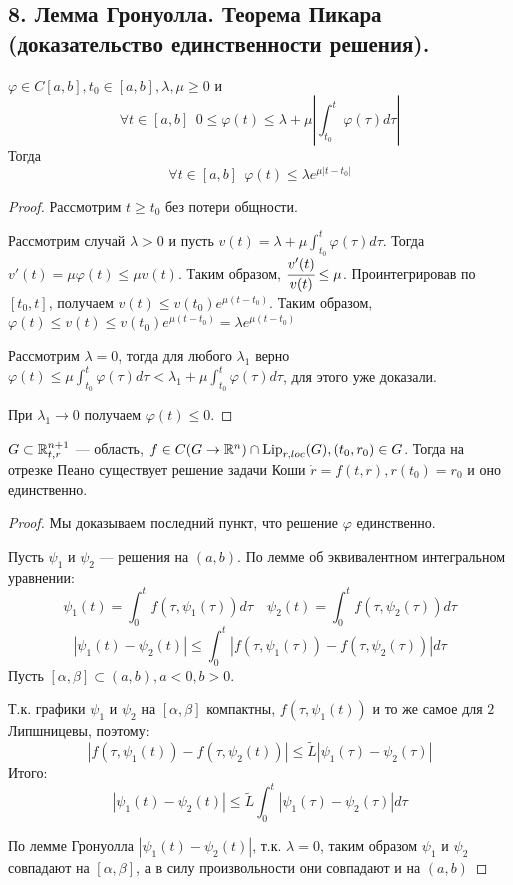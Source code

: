 \subsection*{8. Лемма Гронуолла. Теорема Пикара (доказательство единственности решения).}

\begin{lemma}[Гронуолл]
    \(\varphi\in C[a, b], t_0\in[a, b], \lambda,\mu \geq 0\) и
    \[\forall t\in[a, b] \ \ 0 \leq \varphi(t) \leq \lambda + \mu\left|\int_{t_0}^t \varphi(\tau)d\tau\right|\]
    Тогда
    \[\forall t\in[a, b] \ \ \varphi(t) \leq \lambda e^{\mu|t - t_0|}\]
\end{lemma}
\begin{proof}
    Рассмотрим \(t \geq t_0\) без потери общности.

    Рассмотрим случай \(\lambda > 0\) и пусть \(v(t) = \lambda + \mu\int_{t_0}^t \varphi(\tau)d\tau\). Тогда \(v'(t) = \mu\varphi(t) \leq \mu v(t)\). Таким образом, \(\cfrac{v'(t)}{v(t)} \leq \mu\). Проинтегрировав по \([t_0, t]\), получаем \(v(t) \leq v(t_0)e^{\mu(t - t_0)}\). Таким образом, \(\varphi(t) \leq v(t) \leq v(t_0)e^{\mu(t - t_0)} = \lambda e^{\mu(t - t_0)}\)

    Рассмотрим \(\lambda = 0\), тогда для любого \(\lambda_1\) верно \(\varphi(t) \leq \mu\int_{t_0}^t \varphi(\tau)d\tau < \lambda_1 + \mu\int_{t_0}^t \varphi(\tau)d\tau\), для этого уже доказали.

    При \(\lambda_1 \to 0\) получаем \(\varphi(t) \leq 0\).
\end{proof}

\begin{theorem}
    \(G\subset \mathbb{R}^{n + 1}_{t, r}\) --- область, \(f\in C(G \to \mathbb{R}^n)\cap \text{Lip}_{r, loc}(G), (t_0,r_0)\in G\). Тогда на отрезке Пеано существует решение задачи Коши \(\dot{r} = f(t, r), r(t_0) = r_0\) и оно единственно.
\end{theorem}

\begin{proof}
    Мы доказываем последний пункт, что решение \(\varphi\) единственно.

    Пусть \(\psi_1\) и \(\psi_2\) --- решения на \((a, b)\). По лемме об эквивалентном интегральном уравнении:
    \[\psi_1(t) = \int_0^t f(\tau, \psi_1(\tau))d\tau \quad \psi_2(t) = \int_0^t f(\tau, \psi_2(\tau))d\tau\]
    \[|\psi_1(t) - \psi_2(t)| \leq \int_0^t |f(\tau, \psi_1(\tau)) - f(\tau, \psi_2(\tau))|d\tau\]
    Пусть \([\alpha, \beta]\subset (a, b), a < 0, b > 0\).

    Т.к. графики \(\psi_1\) и \(\psi_2\) на \([\alpha, \beta]\) компактны, \(f(\tau, \psi_1(t))\) и то же самое для \(2\) Липшницевы, поэтому:
    \[|f(\tau, \psi_1(t)) - f(\tau, \psi_2(t))| \leq \tilde L|\psi_1(\tau) - \psi_2(\tau)|\]
    Итого:
    \[|\psi_1(t) - \psi_2(t)| \leq \tilde{L} \int_0^t |\psi_1(\tau) - \psi_2(\tau)|d\tau\]

    По лемме Гронуолла \(|\psi_1(t) - \psi_2(t)|\), т.к. \(\lambda = 0\), таким образом \(\psi_1\) и \(\psi_2\) совпадают на \([\alpha, \beta]\), а в силу произвольности они совпадают и на \((a, b)\)
\end{proof}

